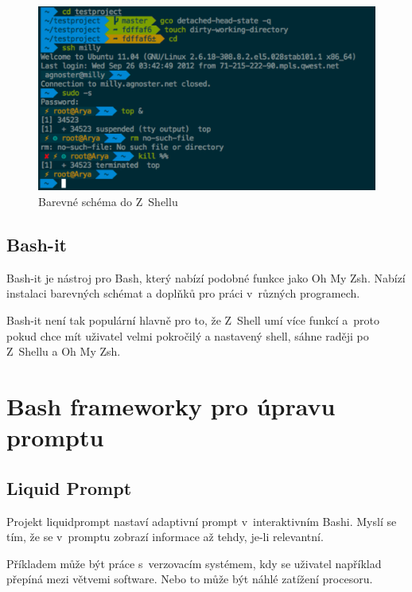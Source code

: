 \documentclass[thesis=M,czech]{FITthesis}[2012/06/26]
\begin{document}
\begin{figure}[htb]\centering
	\includegraphics[width=\textwidth]{./images/zsh_theme}
	\caption{Barevné schéma do Z~Shellu}
	\label{fig:zsh_theme}
\end{figure}



%
%
%
\subsection{Bash-it}

Bash-it \cite{bashit} je nástroj pro Bash, který nabízí podobné funkce jako Oh My Zsh. Nabízí instalaci barevných schémat a doplňků pro práci v~různých programech.

Bash-it není tak populární hlavně pro to, že Z~Shell umí více funkcí a~proto pokud chce mít uživatel velmi pokročilý a nastavený shell, sáhne raději po Z~Shellu a Oh My Zsh.


%

%
%
%
\section{Bash frameworky pro úpravu promptu}

\subsection{Liquid Prompt}

Projekt liquidprompt \cite{liquidprompt} nastaví adaptivní prompt v~interaktivním Bashi. Myslí se tím, že se v~promptu zobrazí informace až tehdy, je-li relevantní.

Příkladem může být práce s~verzovacím systémem, kdy se uživatel například přepíná mezi větvemi software. Nebo to může být náhlé zatížení procesoru.
\end{document}
